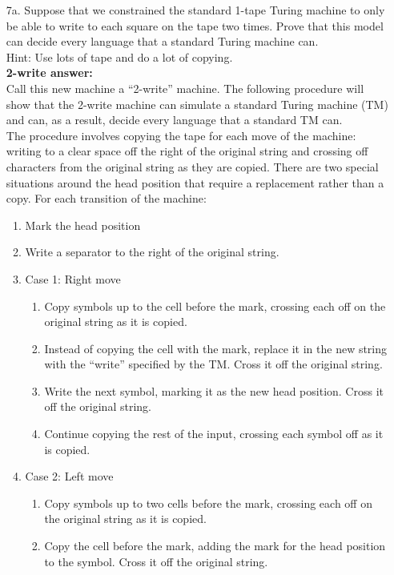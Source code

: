 \documentclass[12pt]{article}
\begin{document}
\begin{itemize}
\item[{\rm 7a.}] Suppose that we constrained the standard 1-tape Turing machine to only be able to write to each square on the tape two times.  Prove that this model can decide every language that a standard Turing machine can.
	\\[.2in]Hint: Use lots of tape and do a lot of copying.
	\\[.2in]\textbf{2-write answer:}
	\\[.2in] Call this new machine a ``2-write'' machine.  The following procedure will show that the 2-write machine can simulate a standard Turing machine (TM) and can, as a result, decide every language that a standard TM can.
	\\[.2in] The procedure involves copying the tape for each move of the machine: writing to a clear space off the right of the original string and crossing off characters from the original string as they are copied. There are two special situations around the head position that require a replacement rather than a copy. For each transition of the machine:	\vspace{.2in}
	\begin{enumerate}
		\item Mark the head position
		\item Write a separator to the right of the original string.
		\item Case 1: Right move
		\begin{enumerate}
			\item Copy symbols up to the cell before the mark, crossing each off on the original string as it is copied.
			\item Instead of copying the cell with the mark, replace it in the new string with the ``write'' specified by the TM. Cross it off the original string.
			\item Write the next symbol, marking it as the new head position. Cross it off the original string.
			\item Continue copying the rest of the input, crossing each symbol off as it is copied.
		\end{enumerate}
		\item Case 2: Left move
		\begin{enumerate}
			\item Copy symbols up to two cells before the mark, crossing each off on the original string as it is copied.
			\item Copy the cell before the mark, adding the mark for the head position to the symbol. Cross it off the original string.

\end{enumerate}
\end{enumerate}
\end{itemize}
\end{document}
